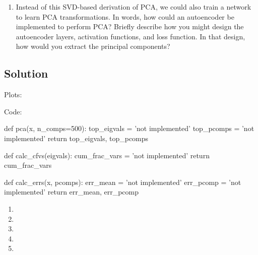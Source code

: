 \documentclass[submit]{harvardml}
\begin{document}
\begin{problem}
\begin{enumerate}
\item Instead of this SVD-based derivation of PCA, we could also train a network to learn PCA transformations. In words, how could an autoencoder be implemented to perform PCA? Briefly describe how you might design the autoencoder layers, activation functions, and loss function. In that design, how would you extract the principal components?
  
\end{enumerate}


\end{problem}

\newpage
\subsection*{Solution}
Plots:



Code:

\begin{python}
def pca(x, n_comps=500):
    top_eigvals = 'not implemented'
    top_pcomps = 'not implemented'
    return top_eigvals, top_pcomps


def calc_cfvs(eigvals):
    cum_frac_vars = 'not implemented'
    return cum_frac_vars


def calc_errs(x, pcomps):
    err_mean = 'not implemented'
    err_pcomp = 'not implemented'
    return err_mean, err_pcomp
\end{python}

\begin{enumerate}
  \item 
  \item 
  \item 
  \item 
  \item 
\end{enumerate}
\end{document}
